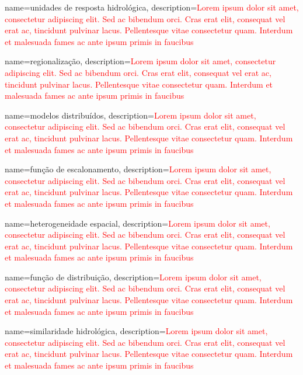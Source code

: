 {
	name=unidades de resposta hidrológica,
	description={\textcolor{red}{Lorem ipsum dolor sit amet, consectetur adipiscing elit. Sed ac bibendum orci. Cras erat elit, consequat vel erat ac, tincidunt pulvinar lacus. Pellentesque vitae consectetur quam. Interdum et malesuada fames ac ante ipsum primis in faucibus}}
}

{
	name=regionalização,
	description={\textcolor{red}{Lorem ipsum dolor sit amet, consectetur adipiscing elit. Sed ac bibendum orci. Cras erat elit, consequat vel erat ac, tincidunt pulvinar lacus. Pellentesque vitae consectetur quam. Interdum et malesuada fames ac ante ipsum primis in faucibus}}
}

{
	name=modelos distribuídos,
	description={\textcolor{red}{Lorem ipsum dolor sit amet, consectetur adipiscing elit. Sed ac bibendum orci. Cras erat elit, consequat vel erat ac, tincidunt pulvinar lacus. Pellentesque vitae consectetur quam. Interdum et malesuada fames ac ante ipsum primis in faucibus}}
}

{
	name=função de escalonamento,
	description={\textcolor{red}{Lorem ipsum dolor sit amet, consectetur adipiscing elit. Sed ac bibendum orci. Cras erat elit, consequat vel erat ac, tincidunt pulvinar lacus. Pellentesque vitae consectetur quam. Interdum et malesuada fames ac ante ipsum primis in faucibus}}
}

{
	name=heterogeneidade espacial,
	description={\textcolor{red}{Lorem ipsum dolor sit amet, consectetur adipiscing elit. Sed ac bibendum orci. Cras erat elit, consequat vel erat ac, tincidunt pulvinar lacus. Pellentesque vitae consectetur quam. Interdum et malesuada fames ac ante ipsum primis in faucibus}}
}

{
	name=função de distribuição,
	description={\textcolor{red}{Lorem ipsum dolor sit amet, consectetur adipiscing elit. Sed ac bibendum orci. Cras erat elit, consequat vel erat ac, tincidunt pulvinar lacus. Pellentesque vitae consectetur quam. Interdum et malesuada fames ac ante ipsum primis in faucibus}}
}

{
	name=similaridade hidrológica,
	description={\textcolor{red}{Lorem ipsum dolor sit amet, consectetur adipiscing elit. Sed ac bibendum orci. Cras erat elit, consequat vel erat ac, tincidunt pulvinar lacus. Pellentesque vitae consectetur quam. Interdum et malesuada fames ac ante ipsum primis in faucibus}}
}

